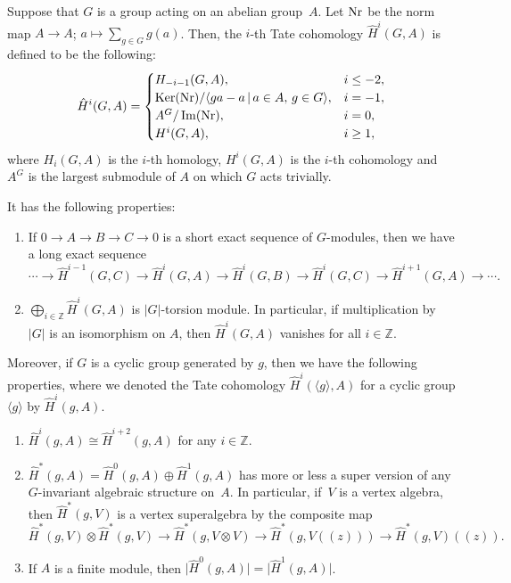 \documentclass[pdftex]{sigma}%
\numberwithin{equation}{section}
\begin{document}
\begin{Definition}[{\cite[Chapter IV]{CF}}]\label{Tate}
Suppose that $G$ is a group acting on an abelian group~$A$. Let ${\rm Nr}$ be the norm map $A\rightarrow A$; $a\mapsto\sum_{g\in G}{g(a)}$. Then, the $i$-th Tate cohomology ${\hat{H}}^i(G,A)$ is defined to be the following:
 \[
{\hat{H}}^i(G,A)= \begin{cases}
H_{-i-1}(G,A), & i\leq-2, \\
\operatorname{Ker}({\rm Nr})/\langle ga-a\,|\,a \in A, \, g\in G\rangle, & i=-1, \\
A^G/\operatorname{Im}({\rm Nr}), & i=0, \\
H^i(G,A), & i \geq1,
 \end{cases}
 \]
where $H_i(G,A)$ is the $i$-th homology, $H^i(G,A)$ is the $i$-th cohomology and $A^G$ is the largest submodule of $A$ on which $G$ acts trivially.
\end{Definition}

It has the following properties:
\begin{enumerate}\itemsep=0pt
\item[(1)] If $0\rightarrow A \rightarrow B \rightarrow C \rightarrow 0$ is a short exact sequence of $G$-modules, then we have a long exact sequence
\[
\cdots \rightarrow {\hat{H}}^{i-1}(G,C)\rightarrow {\hat{H}}^{i}(G,A)\rightarrow {\hat{H}}^{i}(G,B)\rightarrow {\hat{H}}^{i}(G,C)\rightarrow {\hat{H}}^{i+1}(G,A) \rightarrow \cdots.
\]
\item[(2)] $\bigoplus_{i\in \mathbb{Z}}{\hat{H}}^i(G,A)$ is $ |G |$-torsion module. In particular, if multiplication by $|G|$ is an isomorphism on $A$, then $\hat{H}^i(G,A)$ vanishes for all $i\in \mathbb{Z}$.
\end{enumerate}

Moreover, if $G$ is a cyclic group generated by $g$, then we have the following properties, where we denoted the Tate cohomology $\hat{H}^i(\langle g\rangle,A)$ for a cyclic group $\langle g\rangle$ by $\hat{H}^i(g,A)$.
\begin{enumerate}\itemsep=0pt
\item[(3)] ${\hat{H}}^i(g,A)\cong{\hat{H}}^{i+2}(g,A)$ for any $i\in\mathbb{Z}$.
\item[(4)]\label{Tsuper} ${\hat{H}}^\ast (g,A )=\hat{H}^0(g,A)\oplus\hat{H}^1(g,A)$ has more or less a super version of any $G$-invariant algebraic structure on~$A$. In particular, if~$V$ is a vertex algebra, then $\hat{H}^*(g,V)$ is a vertex superalgebra by the composite map
\[
\hat{H}^*(g,V)\otimes \hat{H}^*(g,V)\rightarrow \hat{H}^*(g,V\otimes V)\rightarrow \hat{H}^*(g,V((z)))\rightarrow \hat{H}^*(g,V)((z)).
\]
\item[(5)] If $A$ is a finite module, then $\big|{\hat{H}}^0(g,A)\big|=\big|{\hat{H}}^1(g,A)\big|$.
\end{enumerate}
\end{document}
